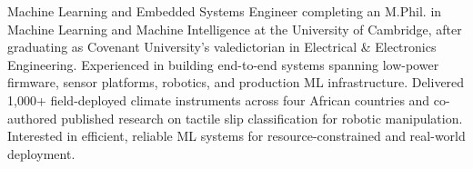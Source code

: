 \noindent
Machine Learning and Embedded Systems Engineer completing an M.Phil. in Machine Learning and Machine Intelligence at the University of Cambridge, after graduating as Covenant University's valedictorian in Electrical \& Electronics Engineering. Experienced in building end-to-end systems spanning low-power firmware, sensor platforms, robotics, and production ML infrastructure. Delivered 1{,}000+ field-deployed climate instruments across four African countries and co-authored published research on tactile slip classification for robotic manipulation. Interested in efficient, reliable ML systems for resource-constrained and real-world deployment.

